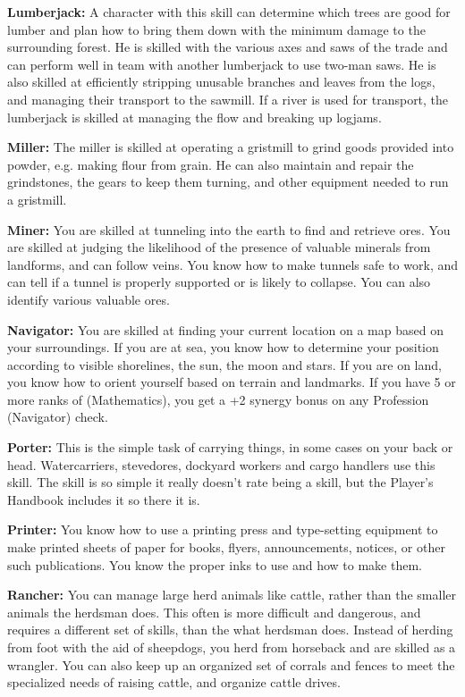 \begin{itemize*}
	\item \textbf{Lumberjack:} A character with this skill can determine which trees are good for lumber and plan how to bring them down with the minimum damage to the surrounding forest. He is skilled with the various axes and saws of the trade and can perform well in team with another lumberjack to use two-man saws. He is also skilled at efficiently stripping unusable branches and leaves from the logs, and managing their transport to the sawmill. If a river is used for transport, the lumberjack is skilled at managing the flow and breaking up logjams.
	\item \textbf{Miller:} The miller is skilled at operating a gristmill to grind goods provided into powder, e.g. making flour from grain. He can also maintain and repair the grindstones, the gears to keep them turning, and other equipment needed to run a gristmill.
	\item \textbf{Miner:} You are skilled at tunneling into the earth to find and retrieve ores. You are skilled at judging the likelihood of the presence of valuable minerals from landforms, and can follow veins. You know how to make tunnels safe to work, and can tell if a tunnel is properly supported or is likely to collapse. You can also identify various valuable ores.
	\item \textbf{Navigator:} You are skilled at finding your current location on a map based on your surroundings. If you are at sea, you know how to determine your position according to visible shorelines, the sun, the moon and stars. If you are on land, you know how to orient yourself based on terrain and landmarks. If you have 5 or more ranks of  (Mathematics), you get a +2 synergy bonus on any Profession (Navigator) check.
	\item \textbf{Porter:} This is the simple task of carrying things, in some cases on your back or head. Watercarriers, stevedores, dockyard workers and cargo handlers use this skill. The skill is so simple it really doesn't rate being a skill, but the Player's Handbook includes it so there it is.
	\item \textbf{Printer:} You know how to use a printing press and type-setting equipment to make printed sheets of paper for books, flyers, announcements, notices, or other such publications. You know the proper inks to use and how to make them.
	\item \textbf{Rancher:} You can manage large herd animals like cattle, rather than the smaller animals the herdsman does. This often is more difficult and dangerous, and requires a different set of skills, than the what herdsman does. Instead of herding from foot with the aid of sheepdogs, you herd from horseback and are skilled as a wrangler. You can also keep up an organized set of corrals and fences to meet the specialized needs of raising cattle, and organize cattle drives.

\end{itemize*}
